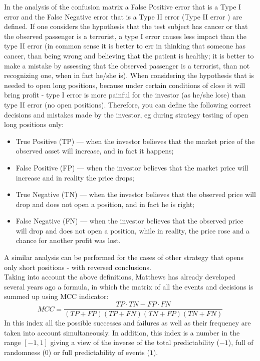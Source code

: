\documentclass{jtacs}
\begin{document}
	In the analysis of the confusion matrix a False Positive error that is a Type I error and the False Negative error that is a Type II error (Type II error \cite{burke}) are defined. If one considers the hypothesis that the test subject has cancer or that the observed passenger is a terrorist, a type I error causes less impact than the type II error (in common sense it is better to err in thinking that someone has cancer, than being wrong and believing that the patient is healthy; it is better to make a mistake by assessing that the observed passenger is a terrorist, than not recognizing one, when in fact he/she is). When considering the hypothesis that is needed to open long positions, because under certain conditions of close it will bring profit - type I error is more painful for the investor (as he/she lose) than type II error (no open positions). Therefore, you can define the following correct decisions and mistakes made by the investor, eg during strategy testing of open long positions only:
\begin{itemize}
\item True  Positive (TP) –-- when the investor believes that the market price of the observed asset will increase, and in fact it happens;
\item False Positive (FP)  --– when the investor believes that the market price will increase and in reality the price drops;
\item True Negative (TN) --– when the investor believes that the observed price will drop and does not open a position, and in fact he is right;
\item False Negative (FN) --– when the investor believes that the observed price will drop and does not open a position, while in reality, the price rose and a chance for another profit was lost.
\end{itemize}
A similar analysis can be performed for the cases of other strategy that opens only short positions - with reversed conclusions.\\
Taking into account the above definitions, Matthews has already developed several years ago a formula, in which the matrix of all the events and decisions is summed up using  MCC indicator:
\begin{equation}
MCC = \frac{TP \cdot TN - FP \cdot FN}{(TP+FP)(TP+FN)(TN+FP)(TN+FN)}
\end{equation}
In this index all the possible successes and failures as well as their frequency are taken into account simultaneously. In addition, this index is a number in the range $[-1, 1]$ giving a view of the inverse of the total predictability ($-1$), full of randomness ($0$) or full predictability of events ($1$).\\
\end{document}
